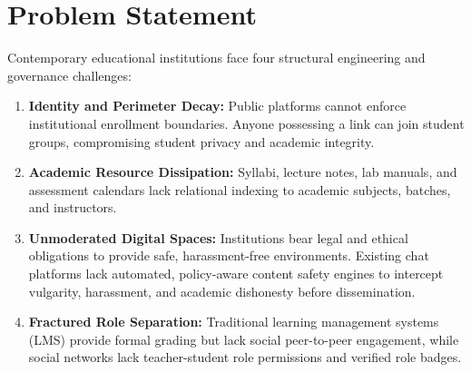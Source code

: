 \documentclass[12pt, a4paper, oneside]{report}
\begin{document}
\section{Problem Statement}
Contemporary educational institutions face four structural engineering and governance challenges:
\begin{enumerate}[leftmargin=0.7cm]
    \item \textbf{Identity and Perimeter Decay:} Public platforms cannot enforce institutional enrollment boundaries. Anyone possessing a link can join student groups, compromising student privacy and academic integrity.
    \item \textbf{Academic Resource Dissipation:} Syllabi, lecture notes, lab manuals, and assessment calendars lack relational indexing to academic subjects, batches, and instructors.
    \item \textbf{Unmoderated Digital Spaces:} Institutions bear legal and ethical obligations to provide safe, harassment-free environments. Existing chat platforms lack automated, policy-aware content safety engines to intercept vulgarity, harassment, and academic dishonesty before dissemination.
    \item \textbf{Fractured Role Separation:} Traditional learning management systems (LMS) provide formal grading but lack social peer-to-peer engagement, while social networks lack teacher-student role permissions and verified role badges.
\end{enumerate}
\end{document}
